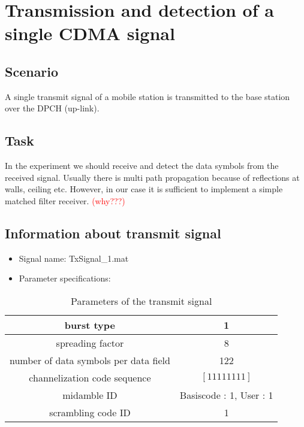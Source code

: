 \chapter{Transmission and detection of a single CDMA signal}

\section{Scenario}
A single transmit signal of a mobile station is transmitted to the base station over the DPCH (up-link).\cite{e1}

\section{Task}
In the experiment we should receive and detect the data symbols from the received signal. Usually there is multi path propagation because of reflections at walls, ceiling etc. However, in our case it is sufficient to implement a simple matched filter receiver. \textcolor{red}{(why???)}

\section{Information about transmit signal}
\begin{itemize}
	\item Signal name: TxSignal\_1.mat \label{siginfo}
	\item Parameter specifications:
\end{itemize}
\begin {table}[H]
\centering
\begin{tabular}{|c|c|}
	
	\hline
	burst type & 1 \\    \hline
	spreading factor & 8 \\   \hline
	number of data symbols per data field & 122 \\   \hline
	channelization code sequence  & $\left[1 1 1 1 1 1 1 1\right]$ \\   \hline
	midamble ID & Basiscode : 1, User : 1 \\   \hline
	scrambling code ID & 1 \\ 
	\hline
\end{tabular}
\caption {Parameters of the transmit signal}
\end{table}

